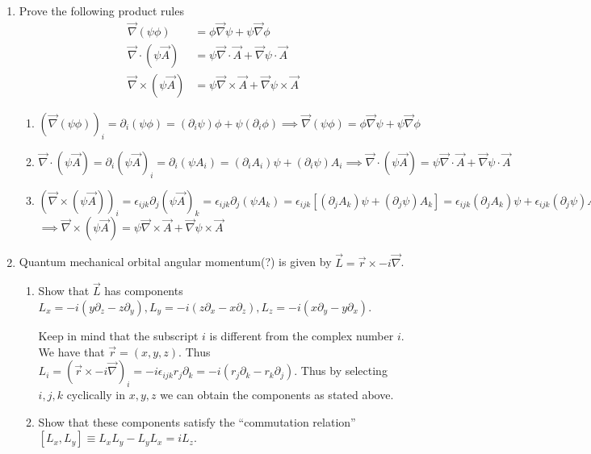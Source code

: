 \documentclass[11pt]{article}
\begin{document}
\begin{enumerate}%
    \item Prove the following product rules
    \begin{align}
        \vec{\nabla}(\psi\phi) &= \phi\vec{\nabla}\psi + \psi\vec{\nabla}\phi \\
        \vec{\nabla}\cdot (\psi\vec{A}) &= \psi\vec{\nabla}\cdot\vec{A} + \vec{\nabla}\psi \cdot \vec{A} \\
        \vec{\nabla}\times (\psi\vec{A}) &= \psi\vec{\nabla}\times\vec{A} + \vec{\nabla}\psi\times\vec{A}
    \end{align}
    \begin{enumerate}[label=(\arabic*)]
        \item $(\vec{\nabla}(\psi\phi))_i = \partial_i(\psi\phi) = (\partial_i\psi)\phi + \psi(\partial_i\phi) \implies \vec{\nabla}(\psi\phi) = \phi\vec{\nabla}\psi + \psi\vec{\nabla}\phi$
        \item $\vec{\nabla}\cdot (\psi\vec{A}) = \partial_i (\psi\vec{A})_i = \partial_i (\psi A_i) = (\partial_i A_i)\psi + (\partial_i\psi) A_i \implies \vec{\nabla}\cdot (\psi\vec{A}) = \psi\vec{\nabla}\cdot\vec{A} + \vec{\nabla}\psi \cdot \vec{A}$
        \item $(\vec{\nabla}\times (\psi\vec{A}))_i = \epsilon_{ijk}\partial_j(\psi\vec{A})_k = \epsilon_{ijk}\partial_j(\psi A_k) = \epsilon_{ijk}[(\partial_j A_k)\psi + (\partial_j\psi) A_k] = \epsilon_{ijk}(\partial_j A_k)\psi + \epsilon_{ijk}(\partial_j\psi)A_k$ $\implies \vec{\nabla}\times (\psi\vec{A}) = \psi\vec{\nabla}\times\vec{A} + \vec{\nabla}\psi\times\vec{A}$
    \end{enumerate}
    \item Quantum mechanical orbital angular momentum(?) is given by $\vec{L} = \vec{r}\times -i\vec{\nabla}$.\begin{enumerate}[label=(\alph*)]
        \item Show that $\vec{L}$ has components $L_x = -i(y\partial_z - z\partial_y), L_y = -i(z\partial_x-x\partial_z), L_z = -i(x\partial_y - y\partial_x)$.
        
        Keep in mind that the subscript $i$ is different from the complex number $i$. We have that $\vec{r} = (x,y,z)$. Thus $L_i = (\vec{r}\times -i\vec{\nabla})_i = -i\epsilon_{ijk}r_j\partial_k = -i(r_j\partial_k - r_k\partial_j)$. Thus by selecting $i,j,k$ cyclically in $x,y,z$ we can obtain the components as stated above.
        \item Show that these components satisfy the ``commutation relation'' $[L_x,L_y]\equiv  L_xL_y - L_yL_x = iL_z$.
        

\end{enumerate}
\end{enumerate}
\end{document}
